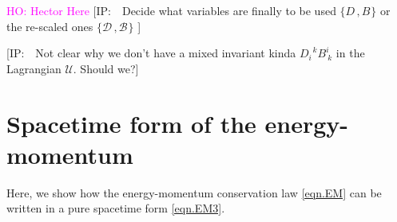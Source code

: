 \documentclass[
10pt, %
a4paper, %
oneside, %
headinclude,footinclude, %
BCOR5mm, %
]{scrartcl}
\newcommand{\IP}[1]{{\color{Red}[IP:\ \ #1]}}
\newcommand{\sA}{\mathsmaller A}
\newcommand{\tetrsymbol}{h}
\newcommand{\tetr}[2]{\tetrsymbol^{#1}_{\phantom{#1}#2}}
\newcommand{\ET}[2]{E^{#1}_{\phantom{#1}#2}}	%
\newcommand{\dT}[2]{D_{#1}^{\phantom{#1}\,#2}}	%
\newcommand{\ddT}[2]{\mathcal{D}_{#1}^{\phantom{#1}\,#2}}	%
\newcommand{\BT}[2]{B^{#1#2}}	%
\newcommand{\bT}[2]{B^{#1#2}}	%
\newcommand{\bbT}[2]{\mathcal{B}^{#1#2}}	%
\newcommand{\hT}[2]{H_{#1#2}}	%
\newcommand{\LagBE}{\mathcal{L}}%
\newcommand{\LagST}{\mathcal{U}}%
\newcommand{\ho}[1]{\textcolor{magenta}{HO: #1}}
\begin{document}

\ho{Hector Here}
\IP{Decide what variables are finally to be used $ \{\dT{}{},\bT{}{}\} $ or the re-scaled ones $ 
\{\ddT{}{},\bbT{}{}\} $ }

\IP{Not clear why we don't have a mixed invariant kinda $ \dT{i}{k} B^i_{\ k} $ in the 
Lagrangian $ \LagST $. Should we?}
\appendix


\section{Spacetime form of the energy-momentum}\label{app.sec.EM}

Here, we show how the energy-momentum conservation law \eqref{eqn.EM} can be written in a pure 
spacetime form \eqref{eqn.EM3}.
\end{document}
